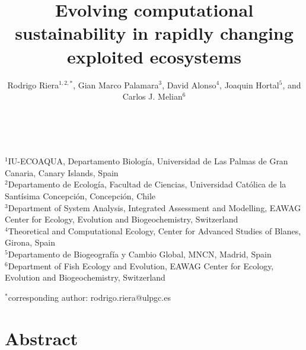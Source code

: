 \documentclass[12pt,a4paper]{article}
\begin{document}
\title{Evolving computational sustainability in rapidly changing exploited ecosystems}

\maketitle
\noindent \author{Rodrigo Riera$^{1,2,*}$, Gian Marco Palamara${^3}$, David Alonso${^4}$, Joaqu\´in Hortal${^5}$, and Carlos J. Meli\´an${^6}$}
            \\
            \vspace{0.25 in}
            
  \noindent  $^{1}$IU-ECOAQUA, Departamento Biolog\'ia, Universidad de Las Palmas de Gran Canaria, Canary Islands, Spain\\
  $^{2}$Departamento de Ecolog\'ia, Facultad de Ciencias, Universidad Cat\'olica de la Sant\'isima Concepci\'on, Concepci\'on, Chile\\
  $^{3}$Department of System Analysis, Integrated Assessment and Modelling, EAWAG Center for Ecology, Evolution and Biogeochemistry, Switzerland\\
  $^{4}$Theoretical and Computational Ecology, Center for Advanced Studies of Blanes, Girona, Spain\\
  $^{5}$Departamento de Biogeograf\'ia y Cambio Global, MNCN, Madrid, Spain\\
  $^{6}$Department of Fish Ecology and Evolution, EAWAG Center for Ecology, Evolution and Biogeochemistry, Switzerland\\
\vspace{0.25 in}

  $^{*}$corresponding author: rodrigo.riera@ulpgc.es

\newpage
\section{Abstract}
\end{document}
